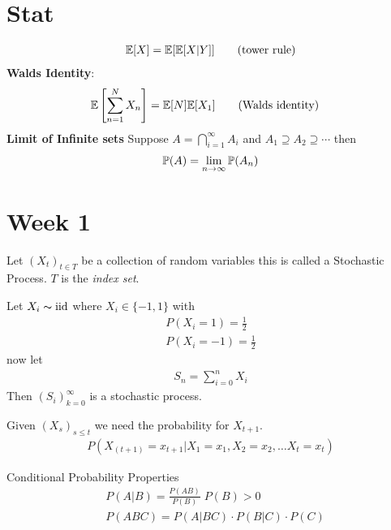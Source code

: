 \documentclass[12pt,a4paper]{article}
\begin{document}
\section*{Stat}
\begin{align*}
    \mathbb{E}[X] = \mathbb{E}[\mathbb{E}[X|Y]] \tag{tower rule}
\end{align*}
\textbf{Walds Identity}:\\
\begin{align*}
    &\mathbb{E}\left[\sum\limits_{n=1}^{N}X_n\right] = \mathbb{E}[N]\mathbb{E}[X_1] \tag{Walds identity}
\end{align*}
\textbf{Limit of Infinite sets}
Suppose $A = \bigcap_{i=1}^\infty A_i$ and $A_1 \supseteq A_2 \supseteq \cdots $ then 
\begin{align*}
    \mathbb{P}(A) = \lim\limits_{n \rightarrow \infty} \mathbb{P}(A_n)
\end{align*}

\newpage
\section{Week 1}
\begin{defn}
    Let $(X_t)_{t\in T}$ be a collection of random variables this is called a Stochastic Process. $T$ is the \textit{index set}. 
\end{defn}
\begin{example}
    Let $X_i\thicksim \mathrm{iid}$ where $X_i \in \{-1,1\}$ with 
    \begin{align*}
        P(X_i = 1) = \frac{1}{2}\\
        P(X_i = -1) = \frac{1}{2}
    \end{align*}
    now let 
    \begin{align*}
        S_n = \sum_{i=0}^n X_i
    \end{align*}
    Then $(S_i)_{k=0}^\infty$ is a stochastic process.  
\end{example}

\begin{defn}
    Given $(X_s)_{s \leq t}$ we need the probability for $X_{t+1}$.
    \begin{align*}
        P(X_{(t+1)} = x_{t+1} \vert X_1 = x_1 , X_2 = x_2, \ldots X_t = x_t)
    \end{align*}
\end{defn}


\begin{note}{Conditional Probability Properties}
    \begin{align*}
        &P(A | B) = \frac{P(AB)}{P(B)} \; P(B) > 0\\
        &P(ABC) = P(A|BC) \cdot P(B|C) \cdot P(C)
    \end{align*}
\end{note}
\end{document}
